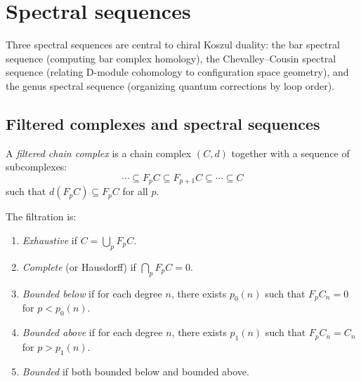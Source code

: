 \chapter{Spectral sequences}
\label{app:spectral-sequences}


Three spectral sequences are central to chiral Koszul duality: the bar spectral sequence
(computing bar complex homology), the Chevalley--Cousin spectral sequence
(relating D-module cohomology to configuration space geometry), and the genus
spectral sequence (organizing quantum corrections by loop order).

\section{Filtered complexes and spectral sequences}
\label{sec:filtered-complexes}

\begin{definition}
\label{def:filtered-complex}
A \emph{filtered chain complex} is a chain complex $(C, d)$ together with a 
sequence of subcomplexes:
\[
\cdots \subseteq F_p C \subseteq F_{p+1} C \subseteq \cdots \subseteq C
\]
such that $d(F_p C) \subseteq F_p C$ for all $p$.

The filtration is:
\begin{enumerate}[label=(\roman*)]
\item \emph{Exhaustive} if $C = \bigcup_p F_p C$.
\item \emph{Complete} (or Hausdorff) if $\bigcap_p F_p C = 0$.
\item \emph{Bounded below} if for each degree $n$, there exists $p_0(n)$
such that $F_p C_n = 0$ for $p < p_0(n)$.
\item \emph{Bounded above} if for each degree $n$, there exists $p_1(n)$
such that $F_p C_n = C_n$ for $p > p_1(n)$.
\item \emph{Bounded} if both bounded below and bounded above.
\end{enumerate}
\end{definition}

